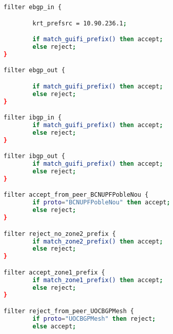 \begin{lstlisting}[language=bash, caption={Bird Functions}]
filter ebgp_in {

        krt_prefsrc = 10.90.236.1;

        if match_guifi_prefix() then accept;
        else reject;
}

filter ebgp_out {

        if match_guifi_prefix() then accept;
        else reject;
}

filter ibgp_in {
        if match_guifi_prefix() then accept;
        else reject;
}

filter ibgp_out {
        if match_guifi_prefix() then accept;
        else reject;
}

filter accept_from_peer_BCNUPFPobleNou {
        if proto="BCNUPFPobleNou" then accept;
        else reject;
}

filter reject_no_zone2_prefix {
        if match_zone2_prefix() then accept;
        else reject;
}

filter accept_zone1_prefix {
        if match_zone1_prefix() then accept;
        else reject;
}

filter reject_from_peer_UOCBGPMesh {
        if proto="UOCBGPMesh" then reject;
        else accept;
\end{lstlisting}